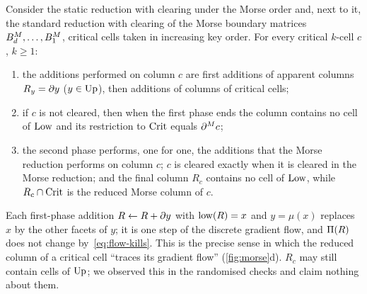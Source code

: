 \begin{corollary}\label{cor:morse-reduction}
Consider the static reduction with clearing under the Morse order and, next to
it, the standard reduction with clearing of the Morse boundary matrices
$B_{d}^M,\dots,B_{1}^M$, critical cells taken in increasing key order. For
every critical $k$-cell $c$, $k\ge1$:
\begin{enumerate}
\item[(i)] the additions performed on column $c$ are first additions of apparent
  columns $R_y=\partial y$ ($y\in\mathrm{Up}$), then additions of columns of critical cells;
\item[(ii)] if $c$ is not cleared, then when the first phase ends the column
  contains no cell of $\mathrm{Low}$ and its restriction to $\mathrm{Crit}$ equals $\partial^{M} c$;
\item[(iii)] the second phase performs, one for one, the additions that the
  Morse reduction performs on column $c$; $c$ is cleared exactly when it is
  cleared in the Morse reduction; and the final column $R_c$ contains no cell
  of $\mathrm{Low}$, while $R_c\cap\mathrm{Crit}$ is the reduced Morse column of $c$.
\end{enumerate}
\end{corollary}

Each first-phase addition $R\gets R+\partial y$ with $\operatorname{low}(R)=x$ and $y=\mu(x)$
replaces $x$ by the other facets of $y$; it is one step of the discrete gradient
flow, and $\Pi(R)$ does not change by~\eqref{eq:flow-kills}. This is the
precise sense in which the reduced column of a critical cell ``traces its
gradient flow'' (\cref{fig:morse}d). $R_c$ may still contain cells of $\mathrm{Up}$; we observed this in
the randomised checks and claim nothing about them.

